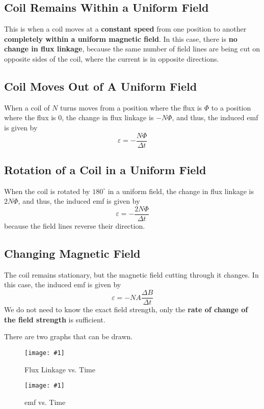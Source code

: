 \documentclass[a4paper,12pt]{article}
\newcommand{\degsym}{^{\circ}}
\newcommand{\img}[4]{\begin{center}
  \begin{figure}[H]
    \centering
    \texttt{[image: \#1]}
    \caption{#3}
    \label{fig:#4}
  \end{figure}
\end{center}}
\begin{document}
\subsection{Coil Remains Within a Uniform Field}

This is when a coil moves at a \textbf{constant speed} from one position to another \textbf{completely within a uniform magnetic field}. In this case, there is \textbf{no change in flux linkage}, because the same number of field lines are being cut on opposite sides of the coil, where the current is in opposite directions.

\subsection{Coil Moves Out of A Uniform Field}

When a coil of $N$ turns moves from a position where the flux is $\Phi$ to a position where the flux is 0, the change in flux linkage is $-N\Phi$, and thus, the induced emf is given by $$\varepsilon = -\frac{N\Phi}{\Delta t}$$

\subsection{Rotation of a Coil in a Uniform Field}

When the coil is rotated by $180\degsym$ in a uniform field, the change in flux linkage is $2N\Phi$, and thus, the induced emf is given by $$\varepsilon = -\frac{2N\Phi}{\Delta t}$$because the field lines reverse their direction.

\pagebreak

\subsection{Changing Magnetic Field}

The coil remains stationary, but the magnetic field cutting through it changes. In this case, the induced emf is given by $$\varepsilon = -NA\frac{\Delta B}{\Delta t}$$We do not need to know the exact field strength, only the \textbf{rate of change of the field strength} is sufficient.

There are two graphs that can be drawn.

\begin{minipage}{0.5\textwidth}
  \img{g1.png}{1}{Flux Linkage vs. Time}{g1}
\end{minipage}\begin{minipage}{0.5\textwidth}
  \img{g2.png}{1}{emf vs. Time}{g1}
\end{minipage}
\end{document}
